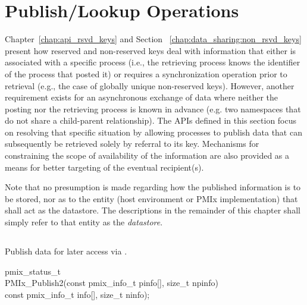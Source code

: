 \chapter{Publish/Lookup Operations}
\label{chap:pub}

Chapter~\ref{chap:api_rsvd_keys}
and
Section ~\ref{chap:data_sharing:non_rsvd_keys}
present how reserved and non-reserved keys deal with
information that either is associated with a specific process (i.e., the
retrieving process knows the identifier of the process that posted it) or
requires a synchronization operation prior to retrieval (e.g., the case of
globally unique non-reserved keys). However, another requirement exists for an
asynchronous exchange of data where neither the posting nor the retrieving
process is known in advance (e.g. two namespaces that do not share a child-parent relationship).
The \acp{API} defined in this section focus on resolving that specific
situation by allowing processes to publish data that can subsequently be
retrieved solely by referral to its key. Mechanisms for constraining
the scope of availability of the information are also provided as a means for better
targeting of the eventual recipient(s).

Note that no presumption is made regarding how the published information is to be stored, nor as to the entity (host environment or \ac{PMIx} implementation) that shall act as the datastore. The descriptions in the remainder of this chapter shall simply refer to that entity as the \emph{datastore}.

\section{}


\summary

Publish data for later access via .

\format




\cspecificstart
\begin{codepar}
pmix_status_t \\
PMIx_Publish2(const pmix_info_t pinfo[], size_t npinfo) \\
\hspace*{12\sigspace}const pmix_info_t info[], size_t ninfo);
\end{codepar}
\cspecificend

